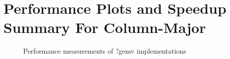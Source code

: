\section{Performance Plots and Speedup Summary For Column-Major}

\begin{figure}[htb]
    \centering
    \caption*{Performance measurements of ?gemv implementations}
    \label{fig:mtv_col_Sgflop220}
    \qquad
    \label{fig:mtv_col_Dgflop220}
\end{figure}

